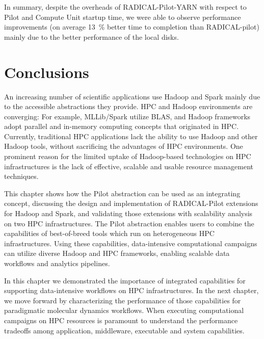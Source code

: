 In summary, despite the overheads of RADICAL-Pilot-YARN with respect to Pilot
and Compute Unit startup time, we were able to observe performance improvements
(on average 13~\% better time to completion than RADICAL-pilot) mainly due to
the better performance of the local disks.


\section{Conclusions}
\label{sec:hpc_hadoop_concl}

An increasing number of scientific applications use Hadoop and Spark mainly due
to the accessible abstractions they provide. HPC and Hadoop environments are
converging: For example, MLLib/Spark utilize BLAS, and Hadoop frameworks adopt
parallel and in-memory computing concepts that originated in HPC. Currently,
traditional HPC applications lack the ability to use Hadoop and other Hadoop
tools, without sacrificing the advantages of HPC environments. One prominent
reason for the limited uptake of Hadoop-based technologies on HPC
infrastructures is the lack of effective, scalable and usable resource
management techniques.

This chapter shows how the Pilot abstraction can be used as an integrating
concept, discussing the design and implementation of RADICAL-Pilot extensions
for Hadoop and Spark, and validating those extensions with scalability analysis
on two HPC infrastructures. The Pilot abstraction enables users to combine the
capabilities of best-of-breed tools which run on heterogeneous HPC
infrastructures. Using these capabilities, data-intensive computational
campaigns can utilize diverse Hadoop and HPC frameworks, enabling
scalable data workflows and analytics pipelines.

In this chapter we demonstrated the importance of integrated capabilities for
supporting data-intensive workflows on HPC infrastructures. In the next chapter,
we move forward by characterizing the performance of those capabilities for
paradigmatic molecular dynamics workflows. When executing computational
campaigns on HPC resources is paramount to understand the performance tradeoffs
among application, middleware, executable and system capabilities.

